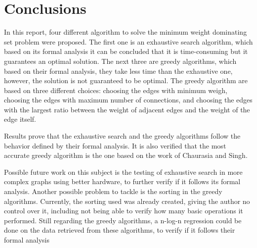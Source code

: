 \section{Conclusions}\label{section:conclusions}
In this report, four different algorithm to solve the minimum weight dominating set problem were proposed.
The first one is an exhaustive search algorithm, which based on its formal analysis it can be concluded that it is time-consuming but it guarantees an optimal solution.
The next three are greedy algorithms, which based on their formal analysis, they take less time than the exhaustive one, however, the solution is not guaranteed to be optimal.
The greedy algorithm are based on three different choices: choosing the edges with minimum weigh, choosing the edges with maximum number of connections, and choosing the edges with the largest ratio between the weight of adjacent edges and the weight of the edge itself.

Results prove that the exhaustive search and the greedy algorithms follow the behavior defined by their formal analysis.
It is also verified that the most accurate greedy algorithm is the one based on the work of Chaurasia and Singh.

Possible future work on this subject is the testing of exhaustive search in more complex graphs using better hardware, to further verify if it follows its formal analysis.
Another possible problem to tackle is the sorting in the greedy algorithms.
Currently, the sorting used was already created, giving the author no control over it, including not being able to verify how many basic operations it performed.
Still regarding the greedy algorithms, a n-log-n regression could be done on the data retrieved from these algorithms, to verify if it follows their formal analysis